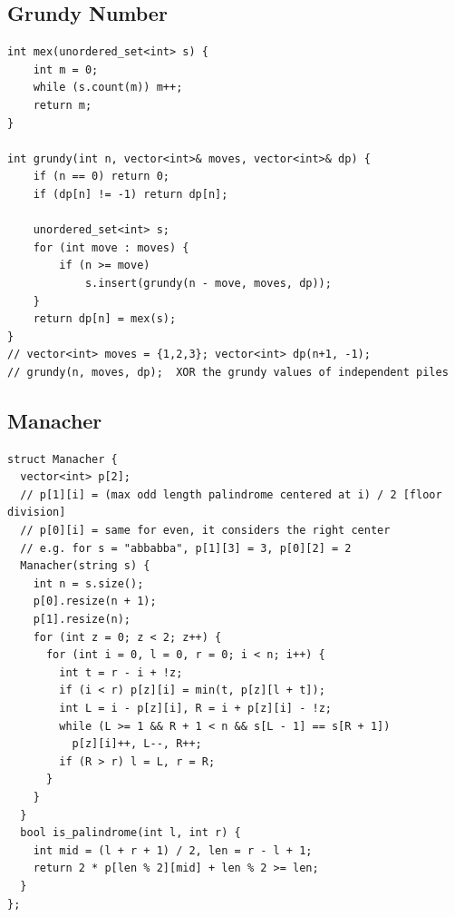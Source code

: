 \subsection{Grundy Number}
\begin{lstlisting}
int mex(unordered_set<int> s) {
    int m = 0;
    while (s.count(m)) m++;
    return m;
}

int grundy(int n, vector<int>& moves, vector<int>& dp) {
    if (n == 0) return 0;
    if (dp[n] != -1) return dp[n];

    unordered_set<int> s;
    for (int move : moves) {
        if (n >= move)
            s.insert(grundy(n - move, moves, dp));
    }
    return dp[n] = mex(s);
}
// vector<int> moves = {1,2,3}; vector<int> dp(n+1, -1);
// grundy(n, moves, dp);  XOR the grundy values of independent piles
\end{lstlisting}
\subsection{Manacher}
\begin{lstlisting}
struct Manacher {
  vector<int> p[2];
  // p[1][i] = (max odd length palindrome centered at i) / 2 [floor division]
  // p[0][i] = same for even, it considers the right center
  // e.g. for s = "abbabba", p[1][3] = 3, p[0][2] = 2
  Manacher(string s) {
    int n = s.size();
    p[0].resize(n + 1);
    p[1].resize(n);
    for (int z = 0; z < 2; z++) {
      for (int i = 0, l = 0, r = 0; i < n; i++) {
        int t = r - i + !z;
        if (i < r) p[z][i] = min(t, p[z][l + t]);
        int L = i - p[z][i], R = i + p[z][i] - !z;
        while (L >= 1 && R + 1 < n && s[L - 1] == s[R + 1])
          p[z][i]++, L--, R++;
        if (R > r) l = L, r = R;
      }
    }
  }
  bool is_palindrome(int l, int r) {
    int mid = (l + r + 1) / 2, len = r - l + 1;
    return 2 * p[len % 2][mid] + len % 2 >= len;
  }
};
\end{lstlisting}
